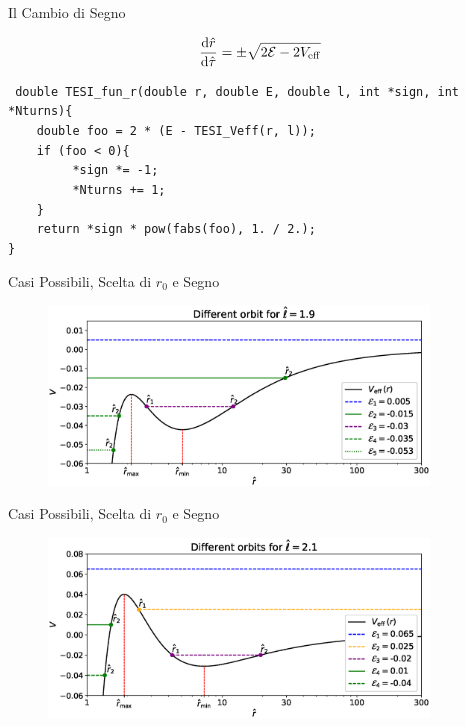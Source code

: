 \begin{frame}{Il Cambio di Segno}

    \begin{equation*}
        \dv{\hat r}{\hat \tau} = \pm \sqrt{2 \mathcal E - 2 V_{\rm eff}}
    \end{equation*}

    \texttt{
    double TESI\_fun\_r(double r, double E, double l, int *sign, int *Nturns)\{ \\
        ~~~~double foo = 2 * (E - TESI\_Veff(r, l)); \\
        ~~~~if (foo < 0)\{ \\
        ~~~~    ~~~~*sign *= -1; \\
        ~~~~    ~~~~*Nturns += 1; \\
        ~~~~\} \\
        ~~~~return *sign * pow(fabs(foo), 1. / 2.); \\
    \}
    }

\end{frame}


\begin{frame}{Casi Possibili, Scelta di $r_0$ e Segno}

    \begin{figure}
        \centering
        \includegraphics[width=0.9\textwidth]{Figures/ch2/scenario1.eps}
    \end{figure}

\end{frame}


\begin{frame}{Casi Possibili, Scelta di $r_0$ e Segno}

    \begin{figure}
        \centering
        \includegraphics[width=0.9\textwidth]{Figures/ch2/scenario2.eps}
    \end{figure}

\end{frame}


